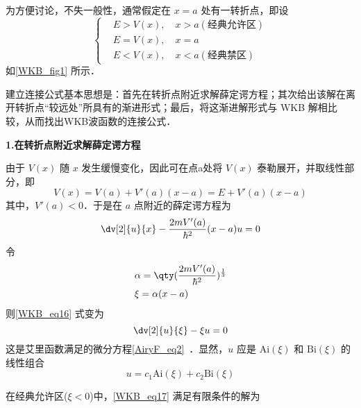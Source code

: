 为方便讨论，不失一般性，通常假定在 $x=a$ 处有一转折点，即设
\begin{equation}
\left\{\begin{aligned}
&E>V(x),\quad x>a(\text{经典允许区})\\
&E=V(x),\quad x=a\\
&E<V(x),\quad x<a(\text{经典禁区})
\end{aligned}\right.
\end{equation}
如\autoref{WKB_fig1} 所示．

建立连接公式基本思想是：首先在转折点附近求解薛定谔方程；其次给出该解在离开转折点“较远处”所具有的渐进形式；最后，将这渐进解形式与 WKB 解相比较，从而找出WKB波函数的连接公式．

\textbf{1.在转折点附近求解薛定谔方程}

由于 $V(x)$ 随 $x$ 发生缓慢变化，因此可在点a处将 $V(x)$ 泰勒展开，并取线性部分，即
\begin{equation}
V(x)=V(a)+V'(a)(x-a)=E+V'(a)(x-a)
\end{equation}
 其中，$V'(a)<0$．于是在 $a$ 点附近的薛定谔方程为
 \begin{equation}\label{WKB_eq16}
 \dv[2]{u}{x}-\frac{2mV'(a)}{\hbar^2}(x-a)u=0
 \end{equation}
令
\begin{equation}
\begin{aligned}
&\alpha=\qty(\frac{2mV'(a)}{\hbar^2})^{\frac{1}{3}}\\
&\xi=\alpha(x-a)
\end{aligned}
\end{equation}
则\autoref{WKB_eq16} 式变为
\begin{equation}\label{WKB_eq17}
\dv[2]{u}{\xi}-\xi u=0
\end{equation}
这是艾里函数满足的微分方程\autoref{AiryF_eq2}~．显然，$u$ 应是 $\mathrm{Ai}(\xi)$ 和 $\mathrm{Bi}(\xi)$ 的线性组合
\begin{equation}
u=c_1 \mathrm{Ai}(\xi)+c_2 \mathrm{Bi}(\xi)
\end{equation}

在经典允许区($\xi<0$)中，\autoref{WKB_eq17} 满足有限条件的解为
